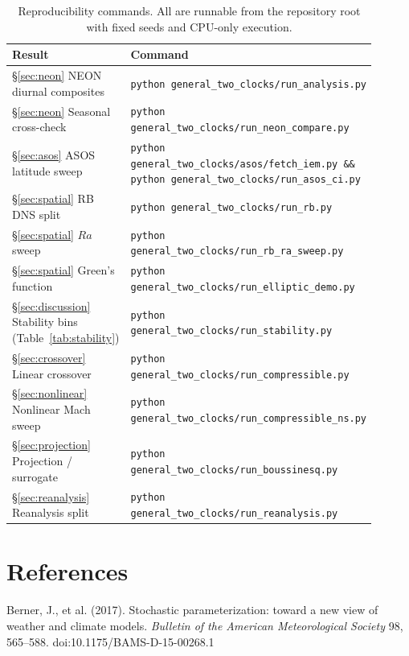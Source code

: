 \documentclass[11pt]{article}
\begin{document}
\begin{table}[h]
\centering
\caption{Reproducibility commands. All are runnable from the repository root with
fixed seeds and CPU-only execution.}
\label{tab:commands}
\small
\begin{tabular}{p{0.35\linewidth}p{0.55\linewidth}}
\toprule
Result & Command \\
\midrule
\S\ref{sec:neon} NEON diurnal composites &
\texttt{python general\_two\_clocks/run\_analysis.py} \\
\S\ref{sec:neon} Seasonal cross-check &
\texttt{python general\_two\_clocks/run\_neon\_compare.py} \\
\S\ref{sec:asos} ASOS latitude sweep &
\texttt{python general\_two\_clocks/asos/fetch\_iem.py \&\&
python general\_two\_clocks/run\_asos\_ci.py} \\
\S\ref{sec:spatial} RB DNS split &
\texttt{python general\_two\_clocks/run\_rb.py} \\
\S\ref{sec:spatial} $Ra$ sweep &
\texttt{python general\_two\_clocks/run\_rb\_ra\_sweep.py} \\
\S\ref{sec:spatial} Green's function &
\texttt{python general\_two\_clocks/run\_elliptic\_demo.py} \\
\S\ref{sec:discussion} Stability bins (Table~\ref{tab:stability}) &
\texttt{python general\_two\_clocks/run\_stability.py} \\
\S\ref{sec:crossover} Linear crossover &
\texttt{python general\_two\_clocks/run\_compressible.py} \\
\S\ref{sec:nonlinear} Nonlinear Mach sweep &
\texttt{python general\_two\_clocks/run\_compressible\_ns.py} \\
\S\ref{sec:projection} Projection / surrogate &
\texttt{python general\_two\_clocks/run\_boussinesq.py} \\
\S\ref{sec:reanalysis} Reanalysis split &
\texttt{python general\_two\_clocks/run\_reanalysis.py} \\
\bottomrule
\end{tabular}
\end{table}

\section*{References}

Berner, J., et al. (2017). Stochastic parameterization: toward a new view of weather and climate models. \emph{Bulletin of the American Meteorological Society} 98, 565--588. doi:10.1175/BAMS-D-15-00268.1
\end{document}
